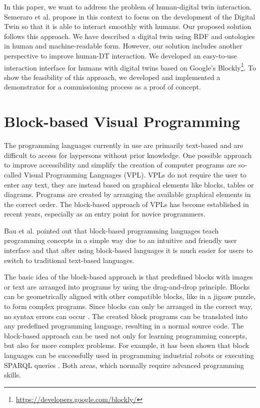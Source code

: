 \documentclass[runningheads]{llncs}
\begin{document}
In this paper, we want to address the problem of human-digital twin interaction.
Semeraro et al. \cite{SEMERARO2021103469} propose in this context to focus on the development of the Digital Twin so that it is able to interact smoothly with humans.
Our proposed solution follows this approach.
We have described a digital twin using RDF and ontologies in human and machine-readable form.
However, our solution includes another perspective to improve human-DT interaction.
We developed an easy-to-use interaction interface for humans with digital twins based on Google's Blockly\footnote{\url{https://developers.google.com/blockly/}}.
To show the feasibility of this approach, we developed and implemented a demonstrator for a commissioning process as a proof of concept.

\section{Block-based Visual Programming}
The programming languages currently in use are primarily text-based and are difficult to access for laypersons without prior knowledge.
One possible approach to improve accessibility and simplify the creation of computer programs are so-called Visual Programming Languages (VPL).
VPLs do not require the user to enter any text, they are instead based on graphical elements like blocks, tables or diagrams.
Programs are created by arranging the available graphical elements in the correct order.
The block-based approach of VPLs has become established in recent years, especially as an entry point for novice programmers.

Bau et al. \cite{1011453015455} pointed out that block-based programming languages teach programming concepts in a simple way due to an intuitive and friendly user interface and that after using block-based languages it is much easier for users to switch to traditional text-based languages.

The basic idea of the block-based approach is that predefined blocks with images or text are arranged into programs by using the drag-and-drop principle.
Blocks can be geometrically aligned with other compatible blocks, like in a jigsaw puzzle, to form complex programs.
Since blocks can only be arranged in the correct way, no syntax errors can occur \cite{10.11453341221}.
The created block programs can be translated into any predefined programming language, resulting in a normal source code. 
The block-based approach can be used not only for learning programming concepts, but also for more complex problems.
For example, it has been shown that block languages can be successfully used in programming industrial robots \cite{8120406} or executing SPARQL queries \cite{7369012}.
Both areas, which normally require advanced programming skills.
\end{document}
